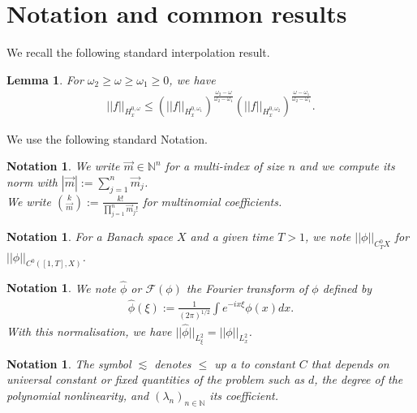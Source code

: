 \documentclass[a4paper, 15pt]{article}
\numberwithin{equation}{section}
\newtheorem{lem}[defi]{Lemma}
\newtheorem{nota}[defi]{Notation}
\begin{document}
\section{Notation and common results}
We recall the following standard interpolation result.\\
\begin{lem}
\label{lem:interpol}
For $\omega_2\geq\omega\geq\omega_1\geq0$, we have
\begin{align}
||f||_{H^{0,\omega}_x}\leq\left(||f||_{H^{0,\omega_1}_x}\right)^{\frac{\omega_2-\omega}{\omega_2-\omega_1}}\left(||f||_{{H^{0,\omega_2}_x}}\right)^{\frac{\omega-\omega_1}{\omega_2-\omega_1}}.
\end{align}
\end{lem}
We use the following standard Notation.\\
\begin{nota}
\label{nota:index}
We write $\overrightarrow{m}\in\mathbb{N}^n$ for a multi-index of size $n$ and we compute its norm with $|\overrightarrow{m}|:=\sum_{j=1}^n\overrightarrow{m}_j$.\\
We write $\binom{k}{\overrightarrow{m}}:=\frac{k!}{\prod_{j=1}^n\overrightarrow{m}_j!}$ for multinomial coefficients. \\
\end{nota}
\begin{nota}
For a Banach space $X$ and a given time $T>1$, we note $||\phi||_{C^0_TX}$ for $||\phi||_{C^0([1,T],X)}$.\\
\end{nota}
\begin{nota}
We note $\hat{\phi}$ or $\mathcal{F}(\phi)$ the Fourier transform of $\phi$ defined by 
\begin{align}
\hat{\phi}(\xi):=\frac{1}{(2\pi)^{1/2}}\int e^{-ix\xi}\phi(x)dx.
\end{align}
With this normalisation, we have $||\hat{\phi}||_{L^2_\xi}=||\phi||_{L^2_x}$.\\
\end{nota}
\begin{nota}
The symbol $\lesssim$ denotes $\leq$ up a to constant $C$ that depends on universal constant or fixed quantities of the problem such as $d$, the degree of the polynomial nonlinearity, and $(\lambda_n)_{n\in\mathbb{N}}$ its coefficient. 
\end{nota}
\end{document}
